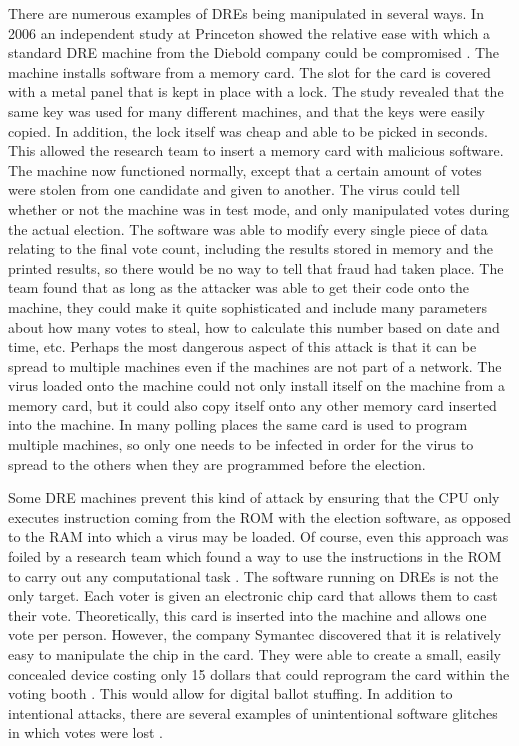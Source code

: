 \documentclass[12pt, titlepage]{article}
\begin{document}
There are numerous examples of DREs being manipulated in several ways. In 2006 an independent study at Princeton showed the relative ease with which a standard DRE machine from the Diebold company could be compromised \cite{feldman2006security}. The machine installs software from a memory card. The slot for the card is covered with a metal panel that is kept in place with a lock. The study revealed that the same key was used for many different machines, and that the keys were easily copied. In addition, the   lock itself was cheap and able to be picked in seconds. This allowed the research team to insert a memory card with malicious software. The machine now functioned normally, except that a certain amount of votes were stolen from one candidate and given to another. The virus could tell whether or not the machine was in test mode, and only manipulated votes during the actual election. The software was able to modify every single piece of data relating to the final vote count, including the results stored in memory and the printed results, so there would be no way to tell that fraud had taken place. The team found that as long as the attacker was able to get their code onto the machine, they could make it quite sophisticated and include many parameters about how many votes to steal, how to calculate this number based on date and time, etc. Perhaps the most dangerous aspect of this attack is that it can be spread to multiple machines even if the machines are not part of a network. The virus loaded onto the machine could not only install itself on the machine from a memory card, but it could also copy itself onto any other memory card inserted into the machine. In many polling places the same card is used to program multiple machines, so only one needs to be infected in order for the virus to spread to the others when they are programmed before the election.

Some DRE machines prevent this kind of attack by ensuring that the CPU only executes instruction coming from the ROM with the election software, as opposed to the RAM into which a virus may be loaded. Of course, even this approach was foiled by a research team which found a way to use the instructions in the ROM to carry out any computational task \cite{hao2016real}. The software running on DREs is not the only target. Each voter is given an electronic chip card that allows them to cast their vote. Theoretically, this card is inserted into the machine and allows one vote per person. However, the company Symantec discovered that it is relatively easy to manipulate the chip in the card. They were able to create a small, easily concealed device costing only 15 dollars that could reprogram the card within the voting booth \cite{symantec}. This would allow for digital ballot stuffing. In addition to intentional attacks, there are several examples of unintentional software glitches in which votes were lost \cite{lostvotes}.
\end{document}
